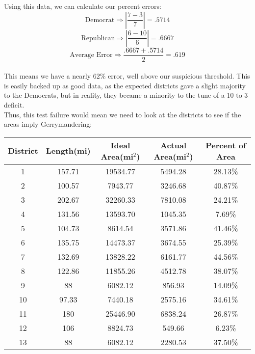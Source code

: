 \documentclass[12pt]{article}
\begin{document}
		\noindent
		Using this data, we can calculate our percent errors:
		\[\text{Democrat} \Rightarrow \left|\frac{7 - 3}{7}\right| = .5714\]
		\[ \text{Republican} \Rightarrow \left|\frac{6 - 10}{6}\right| = .6667\]
		\[\text{Average Error} \Rightarrow \frac{.6667 + .5714}{2} = .619\]
		\\This means we have a nearly $62\%$ error, well above our suspicious threshold.  This is easily backed up as good data, as the expected districts gave a slight majority to the Democrats, but in reality, they became a minority to the tune of a 10 to 3 deficit.
		\\Thus, this test failure would mean we need to look at the districts to see if the areas imply Gerrymandering\cite{ncdistrictdata}:
			\begin{center}
				\begin{tabular}{ c  c  c  c  c }
					
					\textbf{District} & 
					\textbf{Length(mi)} & \textbf{Ideal Area(mi$^2$)} & \textbf{Actual Area(mi$^2$)} & \textbf{Percent of Area} \\
					\hline
					1 & 157.71 & 19534.77 & 5494.28 & 28.13\%\\
					
					2 & 100.57 & 7943.77 & 3246.68 & 40.87\%\\
					
					3 & 202.67 & 32260.33 & 7810.08 & 24.21\%\\
					
					4 & 131.56 & 13593.70 & 1045.35 & 7.69\%\\
					
					5 & 104.73 & 8614.54 & 3571.86 & 41.46\%\\
					
					6 & 135.75 & 14473.37 & 3674.55 & 25.39\%\\
					
					7 & 132.69 & 13828.22 & 6161.77 & 44.56\%\\
					
					8 & 122.86 & 11855.26 & 4512.78 & 38.07\%\\
					
					9 & 88 & 6082.12 & 856.93 & 14.09\%\\
					
					10 & 97.33 & 7440.18 & 2575.16 & 34.61\%\\
					
					11 & 180 & 25446.90 & 6838.24 & 26.87\%\\
					
					12 & 106 & 8824.73 & 549.66 & 6.23\%\\
					
					13 & 88 & 6082.12 & 2280.53 & 37.50\%\\
					\hline
				\end{tabular}
			\end{center}
		
\end{document}
